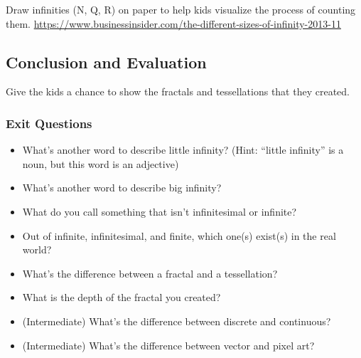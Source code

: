 \documentclass{lessonplan}
\begin{document}
        Draw infinities (N, Q, R) on paper to help kids visualize the process of counting them.
      \url{https://www.businessinsider.com/the-different-sizes-of-infinity-2013-11}
    \subsection{Conclusion and Evaluation}
      Give the kids a chance to show the fractals and tessellations that they created.
      \subsubsection{Exit Questions}
      \begin{itemize}
        \item What's another word to describe little infinity? (Hint: ``little infinity'' is a noun, but this word is an 
          adjective)
        \item What's another word to describe big infinity?
        \item What do you call something that isn't infinitesimal or infinite?
        \item Out of infinite, infinitesimal, and finite, which one(s) exist(s) in the real world?
        \item What's the difference between a fractal and a tessellation?
        \item What is the depth of the fractal you created? 
        \item (Intermediate) What's the difference between discrete and continuous? 
        \item (Intermediate) What's the difference between vector and pixel art?
      \end{itemize}
\end{document}
